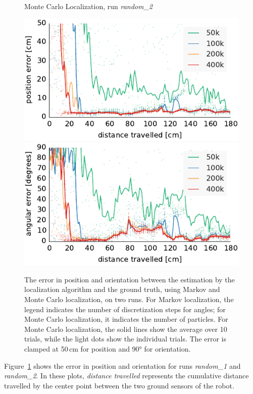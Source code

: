 \documentclass[letterpaper, 10pt, conference]{ieeeconf}
\newcommand{\Fig}[1]{Figure~\ref{fig:#1}}
\begin{document}
\begin{figure}
\begin{center}
Monte Carlo Localization, run \emph{random\_2}
\end{center}
\includegraphics{mcl-whole_random_2-xy}\hfill
\includegraphics{mcl-whole_random_2-theta}

\caption{The error in position and orientation between the estimation by the localization algorithm and the ground truth, using Markov and Monte Carlo localization, on two runs.
For Markov localization, the legend indicates the number of discretization steps for angles; for Monte Carlo localization, it indicates the number of particles.
For Monte Carlo localization, the solid lines show the average over 10 trials, while the light dots show the individual trials.
The error is clamped at 50\,cm for position and 90° for orientation.}
\label{fig:whole-runs-random12}
\end{figure}

\Fig{whole-runs-random12} shows the error in position and orientation for runs \emph{random\_1} and \emph{random\_2}.
In these plots, \emph{distance travelled} represents the cumulative distance travelled by the center point between the two ground sensors of the robot.
\end{document}

